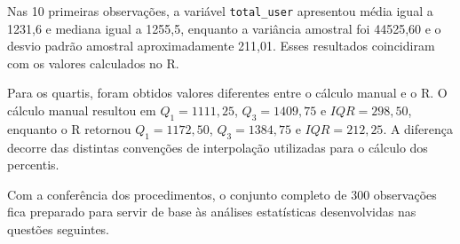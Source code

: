 \documentclass[12pt,a4paper]{article}
\begin{document}
Nas 10 primeiras observações, a variável \texttt{total\_user} apresentou média
igual a 1231,6 e mediana igual a 1255,5, enquanto a variância amostral foi
44525,60 e o desvio padrão amostral aproximadamente 211,01. Esses resultados
coincidiram com os valores calculados no R.

Para os quartis, foram obtidos valores diferentes entre o cálculo manual e o R.
O cálculo manual resultou em $Q_1=1111{,}25$, $Q_3=1409{,}75$ e
$IQR=298{,}50$, enquanto o R retornou $Q_1=1172{,}50$,
$Q_3=1384{,}75$ e $IQR=212{,}25$. A diferença decorre das distintas convenções
de interpolação utilizadas para o cálculo dos percentis.

Com a conferência dos procedimentos, o conjunto completo de 300 observações
fica preparado para servir de base às análises estatísticas desenvolvidas nas
questões seguintes.
\end{document}
